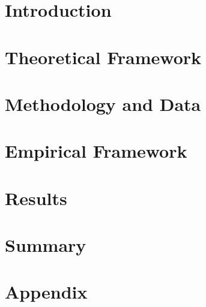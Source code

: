 \documentclass{article}
\begin{document}


\section{Introduction}



\section{Theoretical Framework}



\section{Methodology and Data}



\section{Empirical Framework}



\section{Results}



\section{Summary}



\printbibliography


\section{Appendix}


\end{document}
